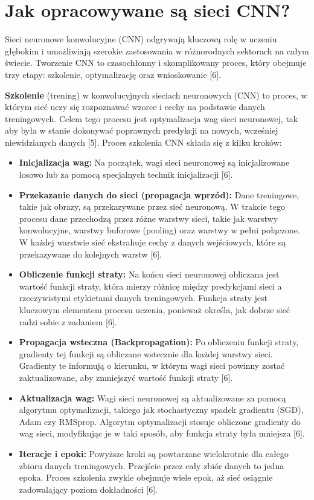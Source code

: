 \section{Jak opracowywane są sieci CNN?}
Sieci neuronowe konwolucyjne (CNN) odgrywają kluczową rolę w uczeniu głębokim i umożliwiają szerokie zastosowania w różnorodnych sektorach na całym świecie. Tworzenie CNN to czasochłonny i skomplikowany proces, który obejmuje trzy etapy: szkolenie, optymalizację oraz wnioskowanie [6].

\textbf{Szkolenie} (trening) w konwolucyjnych sieciach neuronowych (CNN) to proces, w którym sieć uczy się rozpoznawać wzorce i cechy na podstawie danych treningowych. Celem tego procesu jest optymalizacja wag sieci neuronowej, tak aby była w stanie dokonywać poprawnych predykcji na nowych, wcześniej niewidzianych danych [5]. Proces szkolenia CNN składa się z kilku kroków:
\begin{itemize}
    \item \textbf{Inicjalizacja wag:} Na początek, wagi sieci neuronowej są inicjalizowane losowo lub za pomocą specjalnych technik inicjalizacji [6].
    \item \textbf{Przekazanie danych do sieci (propagacja wprzód):} Dane treningowe, takie jak obrazy, są przekazywane przez sieć neuronową. W trakcie tego procesu dane przechodzą przez różne warstwy sieci, takie jak warstwy konwolucyjne, warstwy buforowe (pooling) oraz warstwy w pełni połączone. W każdej warstwie sieć ekstrahuje cechy z danych wejściowych, które są przekazywane do kolejnych warstw [6].
    \item \textbf{Obliczenie funkcji straty:} Na końcu sieci neuronowej obliczana jest wartość funkcji straty, która mierzy różnicę między predykcjami sieci a rzeczywistymi etykietami danych treningowych. Funkcja straty jest kluczowym elementem procesu uczenia, ponieważ określa, jak dobrze sieć radzi sobie z zadaniem [6].
    \item \textbf{Propagacja wsteczna (Backpropagation): }Po obliczeniu funkcji straty, gradienty tej funkcji są obliczane wstecznie dla każdej warstwy sieci. Gradienty te informują o kierunku, w którym wagi sieci powinny zostać zaktualizowane, aby zmniejszyć wartość funkcji straty [6].
    \item \textbf{Aktualizacja wag:} Wagi sieci neuronowej są aktualizowane za pomocą algorytmu optymalizacji, takiego jak stochastyczny spadek gradientu (SGD), Adam czy RMSprop. Algorytm optymalizacji stosuje obliczone gradienty do wag sieci, modyfikując je w taki sposób, aby funkcja straty była mniejsza [6].
    \item \textbf{Iteracje i epoki: }Powyższe kroki są powtarzane wielokrotnie dla całego zbioru danych treningowych. Przejście przez cały zbiór danych to jedna epoka. Proces szkolenia zwykle obejmuje wiele epok, aż sieć osiągnie zadowalający poziom dokładności [6].
\end{itemize}

